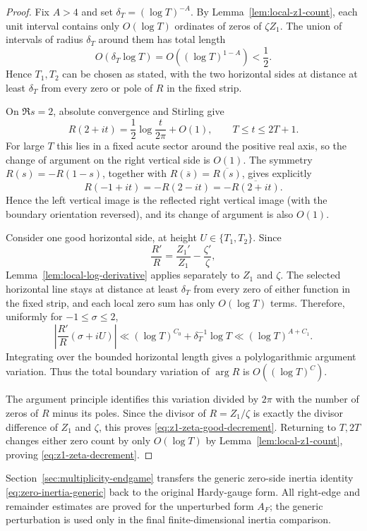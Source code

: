 \begin{proof}
Fix $A>4$ and set $\delta_T=(\log T)^{-A}$. By
Lemma~\ref{lem:local-z1-count}, each unit interval contains only $O(\log T)$
ordinates of zeros of $\zeta Z_1$. The union of intervals of radius
$\delta_T$ around them has total length
\[
O(\delta_T\log T)=O((\log T)^{1-A})<\frac12.
\]
Hence $T_1,T_2$ can be chosen as stated, with the two horizontal sides at
distance at least $\delta_T$ from every zero or pole of $R$ in the fixed strip.

On $\Re s=2$, absolute convergence and Stirling give
\[
R(2+it)=\frac12\log\frac{t}{2\pi}+O(1),
\qquad T\le t\le2T+1.
\]
For large $T$ this lies in a fixed acute sector around the positive real axis,
so the change of argument on the right vertical side is $O(1)$. The symmetry
$R(s)=-R(1-s)$, together with
$R(\overline s)=\overline{R(s)}$, gives explicitly
\[
R(-1+it)=-R(2-it)=-\overline{R(2+it)}.
\]
Hence the left vertical image is the reflected right vertical image (with the
boundary orientation reversed), and its change of argument is also $O(1)$.

Consider one good horizontal side, at height $U\in\{T_1,T_2\}$. Since
\[
\frac{R'}R=\frac{Z_1'}{Z_1}-\frac{\zeta'}\zeta,
\]
Lemma~\ref{lem:local-log-derivative} applies separately to $Z_1$ and $\zeta$.
The selected horizontal line stays at distance at least $\delta_T$ from every
zero of either function in the fixed strip, and each local zero sum has only
$O(\log T)$ terms. Therefore, uniformly for $-1\le\sigma\le2$,
\begin{equation}
\left|\frac{R'}R(\sigma+iU)\right|
\ll (\log T)^{C_0}+\delta_T^{-1}\log T
\ll(\log T)^{A+C_1}.
\label{eq:good-horizontal-logderivative}
\end{equation}
Integrating over the bounded horizontal length gives a polylogarithmic argument
variation. Thus the total boundary variation of $\arg R$ is
$O((\log T)^C)$.

The argument principle identifies this variation divided by $2\pi$ with the
number of zeros of $R$ minus its poles. Since the divisor of $R=Z_1/\zeta$ is
exactly the divisor difference of $Z_1$ and $\zeta$, this proves
\eqref{eq:z1-zeta-good-decrement}. Returning to $T,2T$ changes
either zero count by only $O(\log T)$ by Lemma~\ref{lem:local-z1-count}, proving
\eqref{eq:z1-zeta-decrement}.
\end{proof}

Section~\ref{sec:multiplicity-endgame} transfers the generic zero-side inertia
identity \eqref{eq:zero-inertia-generic} back to the original Hardy-gauge form.
All right-edge and remainder estimates are proved for the unperturbed form
$A_F$; the generic perturbation is used only in the final finite-dimensional
inertia comparison.
